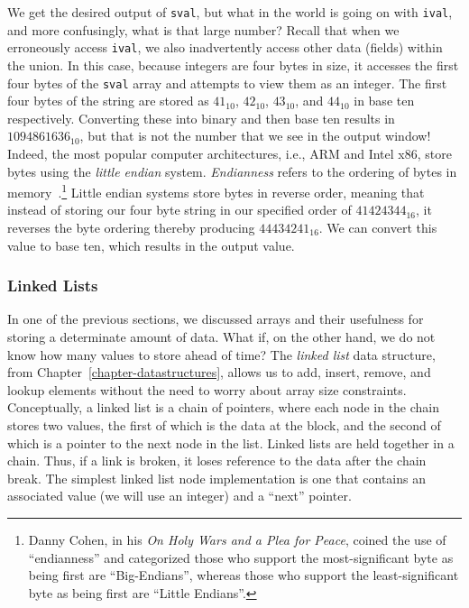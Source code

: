 We get the desired output of \texttt{sval}, but what in the world is going on with \texttt{ival}, and more confusingly, what is that large number? Recall that when we erroneously access \texttt{ival}, we also inadvertently access other data (fields) within the union. In this case, because integers are four bytes in size, it accesses the first four bytes of the \texttt{sval} array and attempts to view them as an integer. The first four bytes of the string  are stored as $41_{10}$, $42_{10}$, $43_{10}$, and $44_{10}$ in base ten respectively. Converting these into binary and then base ten results in $1094861636_{10}$, but that is not the number that we see in the output window! Indeed, the most popular computer architectures, i.e., ARM and Intel x86, store bytes using the \textit{little endian} system. \textit{Endianness} refers to the ordering of bytes in memory~\cite{compsysapp}.\footnote{Danny Cohen, in his \textit{On Holy Wars and a Plea for Peace}, coined the use of ``endianness'' and categorized those who support the most-significant byte as being first are ``Big-Endians'', whereas those who support the least-significant byte as being first are ``Little Endians''.} Little endian systems store bytes in reverse order, meaning that instead of storing our four byte string in our specified order of $41424344_{16}$, it reverses the byte ordering thereby producing $44434241_{16}$. We can convert this value to base ten, which results in the output value.  

\subsubsection*{Linked Lists}

In one of the previous sections, we discussed arrays and their usefulness for storing a determinate amount of data. What if, on the other hand, we do not know how many values to store ahead of time? The \textit{linked list} data structure, from Chapter~\ref{chapter-datastructures}, allows us to add, insert, remove, and lookup elements without the need to worry about array size constraints. Conceptually, a linked list is a chain of pointers, where each node in the chain stores two values, the first of which is the data at the block, and the second of which is a pointer to the next node in the list. Linked lists are held together in a chain. Thus, if a link is broken, it loses reference to the data after the chain break. The simplest linked list node implementation is one that contains an associated value (we will use an integer) and a ``next'' pointer. 

